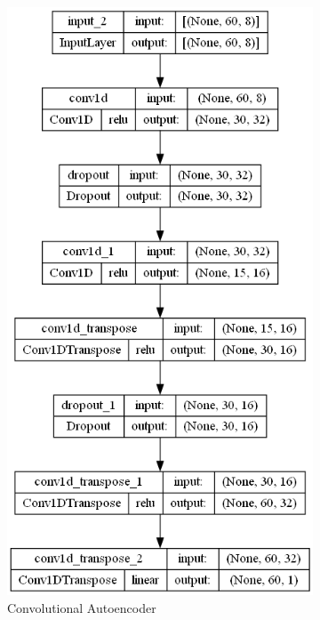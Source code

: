 \documentclass[a4paper,12pt]{report}
\theoremstyle{definitionNODot}
\begin{document}
\begin{figure}[H]
\begin{subfigure}[b]{0.3\textwidth}
			\includegraphics[width=\textwidth]{plot_model_conv_ae_model.png}
			\caption{Convolutional Autoencoder}
			\label{fig:plot_model_conv_ae_model}
		\end{subfigure}
		\hfill
		\begin{subfigure}[b]{0.3\textwidth}
			\centering

\end{subfigure}
\end{figure}
\end{document}
